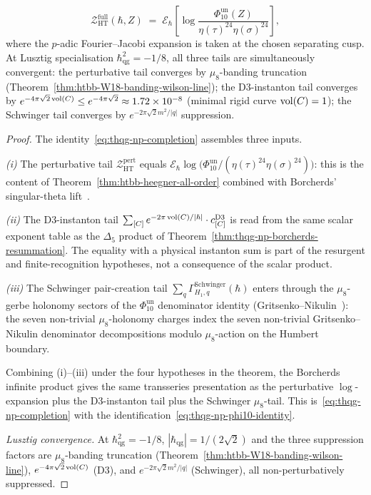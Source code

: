 \begin{theorem}
\begin{equation}
 \mathcal{Z}^{\mathrm{full}}_{\mathrm{HT}}(\hbar, Z)
 \;=\;
 \mathscr E_\hbar\!\left[
 \log\frac{\Phi_{10}^{\mathrm{un}}(Z)}
 {\eta(\tau)^{24}\eta(\sigma)^{24}}
 \right],
\end{equation}
where the \(p\)-adic Fourier--Jacobi expansion is taken at the chosen
separating cusp. At Lusztig specialisation $\hbar_{\mathrm{qg}}^2 =
-1/8$, all three tails are simultaneously convergent: the
perturbative tail converges by $\mu_8$-banding truncation
(Theorem~\ref{thm:htbb-W18-banding-wilson-line}); the D$3$-instanton
tail converges by
$e^{-4\pi\sqrt 2\operatorname{vol}(C)}\leq e^{-4\pi\sqrt 2}\approx 1.72\times 10^{-8}$
(minimal rigid curve $\operatorname{vol}(C) = 1$); the Schwinger tail converges by
$e^{-2\pi\sqrt 2 m^2/|q|}$ suppression.
\end{theorem}

\begin{proof}
The identity~\eqref{eq:thqg-np-completion} assembles three inputs.

\emph{(i)} The perturbative tail
$\mathcal{Z}^{\mathrm{pert}}_{\mathrm{HT}}$ equals
\(\mathscr E_\hbar\log\bigl(\Phi_{10}^{\mathrm{un}}/
(\eta(\tau)^{24}\eta(\sigma)^{24})\bigr)\): this is the content of
Theorem~\ref{thm:htbb-heegner-all-order} combined with Borcherds'
singular-theta lift~\cite[Thm.~10.1]{Borcherds1998}.

\emph{(ii)} The D$3$-instanton tail
$\sum_{[C]}e^{-2\pi\operatorname{vol}(C)/|\hbar|}\cdot c^{\mathrm{D3}}_{[C]}$
is read from the same scalar exponent table as the
$\Delta_5$ product of Theorem~\ref{thm:thqg-np-borcherds-resummation}.
The equality with a physical instanton sum is part of the resurgent and
finite-recognition hypotheses, not a consequence of the scalar product.

\emph{(iii)} The Schwinger pair-creation tail
$\sum_q\Gamma^{\mathrm{Schwinger}}_{H_1, q}(\hbar)$ enters through
the $\mu_8$-gerbe holonomy sectors of the $\Phi_{10}^{\mathrm{un}}$ denominator
identity (Gritsenko--Nikulin~\cite[\S 3]{GritsenkoNikulin1998}): the
seven non-trivial $\mu_8$-holonomy charges index the seven non-trivial
Gritsenko--Nikulin denominator decompositions modulo $\mu_8$-action on
the Humbert boundary.

Combining (i)--(iii) under the four hypotheses in the theorem, the
Borcherds infinite product gives the same transseries presentation as
the perturbative $\log$-expansion plus the D$3$-instanton tail plus
the Schwinger $\mu_8$-tail. This is~\eqref{eq:thqg-np-completion}
with the identification~\eqref{eq:thqg-np-phi10-identity}.

\emph{Lusztig convergence.} At $\hbar^2_{\mathrm{qg}} = -1/8$,
$|\hbar_{\mathrm{qg}}| = 1/(2\sqrt 2)$ and the three suppression
factors are $\mu_8$-banding truncation
(Theorem~\ref{thm:htbb-W18-banding-wilson-line}),
$e^{-4\pi\sqrt 2\operatorname{vol}(C)}$ (D$3$), and $e^{-2\pi\sqrt 2 m^2/|q|}$
(Schwinger), all non-perturbatively suppressed.
\end{proof}

